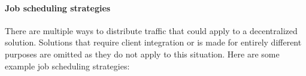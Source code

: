 \paragraph{Job scheduling strategies} %
There are multiple ways to distribute traffic that could apply to a decentralized solution.
Solutions that require client integration or is made for entirely different purposes are omitted as they do not apply to this situation.
Here are some example job scheduling strategies:


